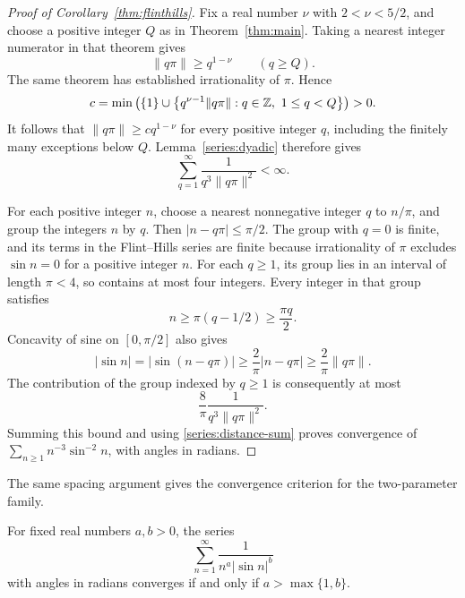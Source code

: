 \begin{proof}[Proof of Corollary~\ref{thm:flinthills}]
Fix a real number \(\nu\) with \(2<\nu<5/2\), and choose a
positive integer \(Q\) as in Theorem~\ref{thm:main}. Taking a nearest
integer numerator in that theorem gives
\[
 \|q\pi\|\ge q^{1-\nu}\qquad(q\ge Q).
\]
The same theorem has established irrationality of \(\pi\). Hence
\[
 c=\min\left(\{1\}\cup
       \left\{q^{\nu-1}\|q\pi\|:q\in\mathbb Z,\ 1\le q<Q\right\}\right)>0.
\]
It follows that \(\|q\pi\|\ge c q^{1-\nu}\) for every positive
integer \(q\), including the finitely many exceptions below \(Q\).
Lemma~\ref{series:dyadic} therefore gives
\begin{equation}\label{series:distance-sum}
 \sum_{q=1}^{\infty}\frac{1}{q^3\|q\pi\|^2}<\infty.
\end{equation}

For each positive integer \(n\), choose a nearest nonnegative integer
\(q\) to \(n/\pi\), and group the integers \(n\) by \(q\).
Then \(|n-q\pi|\le\pi/2\). The group with
\(q=0\) is finite, and its terms in the Flint--Hills series are finite
because irrationality of \(\pi\) excludes \(\sin n=0\) for a
positive integer \(n\). For each \(q\ge1\), its group lies in an
interval of length \(\pi<4\), so contains at most four integers.
Every integer in that group satisfies
\[
 n\ge\pi(q-1/2)\ge\frac{\pi q}{2}.
\]
Concavity of sine on \([0,\pi/2]\) also gives
\[
 |\sin n|=|\sin(n-q\pi)|
 \ge\frac{2}{\pi}|n-q\pi|
 \ge\frac{2}{\pi}\|q\pi\|.
\]
The contribution of the group indexed by \(q\ge1\) is consequently
at most
\[
 \frac{8}{\pi}\frac{1}{q^3\|q\pi\|^2}.
\]
Summing this bound and using \eqref{series:distance-sum} proves
convergence of \(\sum_{n\ge1}n^{-3}\sin^{-2}n\), with angles in
radians.
\end{proof}


The same spacing argument gives the convergence criterion for the
two-parameter family.

\begin{corollary}\label{series:generalized}
For fixed real numbers \(a,b>0\), the series
\[
 \sum_{n=1}^{\infty}\frac{1}{n^a|\sin n|^b}
\]
with angles in radians converges if and only if
\(a>\max\{1,b\}\).
\end{corollary}

